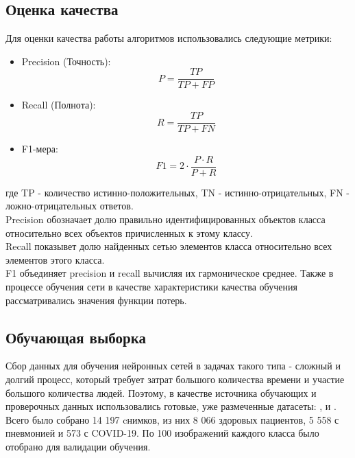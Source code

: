 \subsection{Оценка качества}
Для оценки качества работы алгоритмов использовались следующие метрики:
\begin{itemize}
    \item Precision (Точность): \[P = \frac{TP}{TP+FP}\]
    \item Recall (Полнота): \[R=\frac{TP}{TP+FN}\] 
    \item F1-мера: \[F1=2 \cdot \frac{P \cdot R}{P+R}\] 
\end{itemize}
где TP - количество истинно-положительных, TN - истинно-отрицательных, 
FN - ложно-отрицательных ответов.\\
Precision обозначает долю правильно идентифицированных объектов класса относительно всех объектов причисленных к этому классу. \\Recall показывет долю найденных сетью элементов класса относительно всех элементов этого класса.\\ 
F1 объединяет precision и recall вычисляя их гармоническое среднее.
Также в процессе обучения сети в качестве характеристики качества обучения рассматривались значения функции потерь.

\subsection{Обучающая выборка}
Сбор данных для обучения нейронных сетей в задачах такого типа - сложный и долгий процесс, который требует затрат большого количества времени и участие большого количества людей. Поэтому, в качестве источника обучающих и проверочных данных использовались готовые, уже размеченные датасеты: \cite{tawsifurrahman}, \cite{cohen2020covid} и \cite{wang2020covidnet}. 
Всего было собрано 14 197 cнимков, из них 8 066 здоровых пациентов, 5 558 с пневмонией и 573 с COVID-19. По 100 изображений каждого класса было отобрано для валидации обучения.


% 

